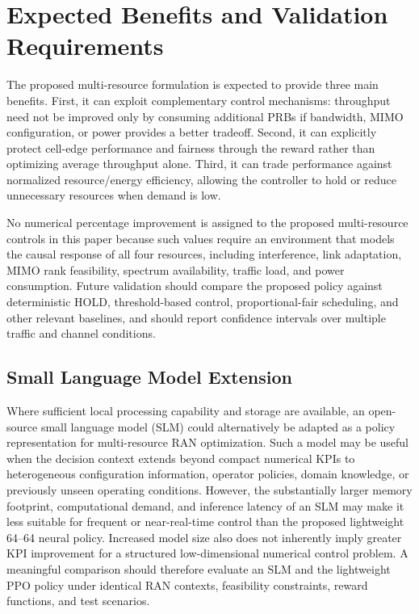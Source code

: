 \documentclass[conference]{IEEEtran}
\begin{document}
\section{Expected Benefits and Validation Requirements}
The proposed multi-resource formulation is expected to provide three main benefits. First, it can exploit complementary control mechanisms: throughput need not be improved only by consuming additional PRBs if bandwidth, MIMO configuration, or power provides a better tradeoff. Second, it can explicitly protect cell-edge performance and fairness through the reward rather than optimizing average throughput alone. Third, it can trade performance against normalized resource/energy efficiency, allowing the controller to hold or reduce unnecessary resources when demand is low.

No numerical percentage improvement is assigned to the proposed multi-resource controls in this paper because such values require an environment that models the causal response of all four resources, including interference, link adaptation, MIMO rank feasibility, spectrum availability, traffic load, and power consumption. Future validation should compare the proposed policy against deterministic HOLD, threshold-based control, proportional-fair scheduling, and other relevant baselines, and should report confidence intervals over multiple traffic and channel conditions.


\subsection{Small Language Model Extension}
Where sufficient local processing capability and storage are available, an open-source small language model (SLM) could alternatively be adapted as a policy representation for multi-resource RAN optimization. Such a model may be useful when the decision context extends beyond compact numerical KPIs to heterogeneous configuration information, operator policies, domain knowledge, or previously unseen operating conditions. However, the substantially larger memory footprint, computational demand, and inference latency of an SLM may make it less suitable for frequent or near-real-time control than the proposed lightweight 64--64 neural policy. Increased model size also does not inherently imply greater KPI improvement for a structured low-dimensional numerical control problem. A meaningful comparison should therefore evaluate an SLM and the lightweight PPO policy under identical RAN contexts, feasibility constraints, reward functions, and test scenarios.
\end{document}
